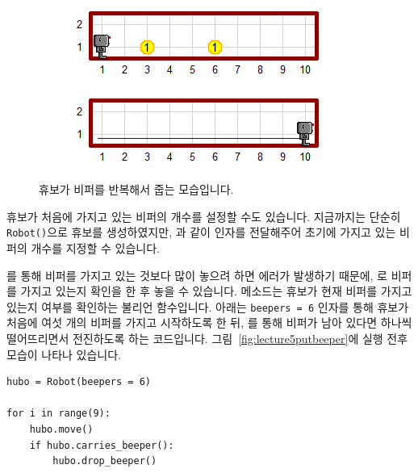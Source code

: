 \documentclass[../main.tex]{subfiles}
\begin{document}
\begin{figure}[htbp]
\centering
\begin{subfigure}{.5\textwidth}
\centering
\includegraphics[width=.9\linewidth]{"./lectures/lecture5_pickbeeperbef"}
\end{subfigure}%
\begin{subfigure}{.5\textwidth}
\centering
\includegraphics[width=.9\linewidth]{"./lectures/lecture5_pickbeeperaft"}
\end{subfigure}
\caption{휴보가 비퍼를 반복해서 줍는 모습입니다.}\label{fig:lecture5pickbeeper}
\end{figure}

휴보가 처음에 가지고 있는 비퍼의 개수를 설정할 수도 있습니다.
지금까지는 단순히 \texttt{Robot()}으로 휴보를 생성하였지만, 과 같이 인자를 전달해주어 초기에 가지고 있는 비퍼의 개수를 지정할 수 있습니다.

를 통해 비퍼를 가지고 있는 것보다 많이 놓으려 하면 에러가 발생하기 때문에, 로 비퍼를 가지고 있는지 확인을 한 후 놓을 수 있습니다.
 메소드는 휴보가 현재 비퍼를 가지고 있는지 여부를 확인하는 불리언 함수입니다.
아래는 \texttt{beepers = 6} 인자를 통해 휴보가 처음에 여섯 개의 비퍼를 가지고 시작하도록 한 뒤, 를 통해 비퍼가 남아 있다면 하나씩 떨어뜨리면서 전진하도록 하는 코드입니다.
그림~\ref{fig:lecture5putbeeper}에 실행 전후 모습이 나타나 있습니다.
\begin{verbatim}
hubo = Robot(beepers = 6)

for i in range(9):
    hubo.move()
    if hubo.carries_beeper():
        hubo.drop_beeper()
      \end{verbatim}
\end{document}
